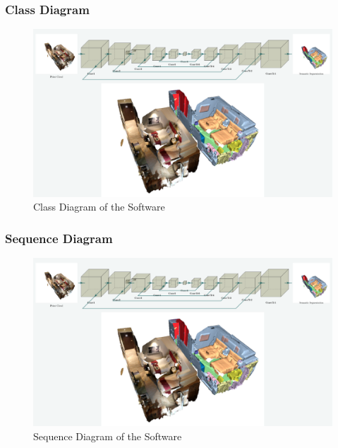 \documentclass[11pt, a4paper,oneside,chapterprefix=false]{scrbook}
\begin{document}
\subsubsection{Class Diagram}

\begin{minipage}{\textwidth}
	\begin{figure}[H]
		\centering
		\includegraphics*[width=1.0\textwidth]{figures/Minkowski Engine.png}
		\caption{Class Diagram of the Software}
		\label{fig:class diagram}
	\end{figure}
\end{minipage}

\subsubsection{Sequence Diagram}

\begin{minipage}{\textwidth}
    \begin{figure}[H]
        \centering
        \includegraphics*[width=1.0\textwidth]{figures/Minkowski Engine.png}
        \caption{Sequence Diagram of the Software}
        \label{fig:sequence diagram}
    \end{figure}
\end{minipage}
\end{document}
